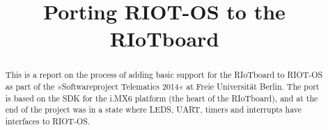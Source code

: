 \documentclass[conference,a4paper]{IEEEtran}
\begin{document}
\title{Porting RIOT-OS to the RIoTboard}

\author{
}

\maketitle

\begin{abstract}
This is a report on the process of adding basic support for the RIoTboard to 
RIOT-OS as part of the »Softwareproject Telematics 2014« at Freie Universität 
Berlin.
The port is based on the SDK for the i.MX6 platform (the heart of the 
RIoTboard), and at the end of the project was in a state where LEDS, UART,
timers and interrupts have interfaces to RIOT-OS.
\end{abstract}

\IEEEpeerreviewmaketitle













\end{document}
